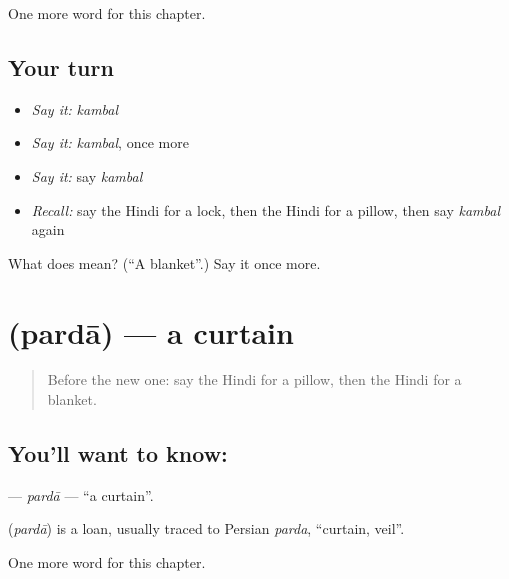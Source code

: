 \begin{grammarlens}[title={What you've built}]
One more word for this chapter.
\end{grammarlens}

\subsection*{Your turn}
\begin{itemize}
\raggedright
  \item \emph{Say it:} \emph{kambal}
  \item \emph{Say it:} \emph{kambal}, once more
  \item \emph{Say it:} say \emph{kambal}
  \item \emph{Recall:} say the Hindi for a lock, then the Hindi for a pillow, then say \emph{kambal} again
\end{itemize}

\begin{tcolorbox}[breakable,colback=teal!4,colframe=teal!35!black,title={Before you move on}]
What does  mean? (\textquotedblleft{}A blanket\textquotedblright{}.) Say it once more.
\end{tcolorbox}
\section[\texorpdfstring{\hi{परदा} (pardā)}{परदा (pardā)}]{ (pardā) — a curtain}

\label{lesson:HI-C129-parda}



\begin{quote}
Before the new one: say the Hindi for a pillow, then the Hindi for a blanket.
\end{quote}

\subsection*{You'll want to know: }
\textbf{} — \emph{pardā} — \textquotedblleft{}a curtain\textquotedblright{}.

\begin{cousinweb}
\textbf{} (\emph{pardā}) is a loan, usually traced to Persian \emph{parda}, \textquotedblleft{}curtain, veil\textquotedblright{}.
\end{cousinweb}

\begin{grammarlens}[title={What you've built}]
One more word for this chapter.
\end{grammarlens}

